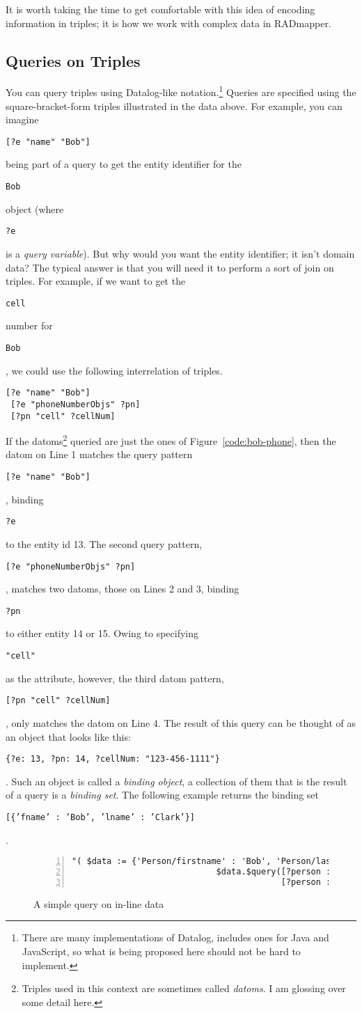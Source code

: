 \documentclass[9pt,letterpaper]{article}
\newcommand{\stt}[1]{\begin{footnotesize}\texttt{#1}\end{footnotesize}}
\begin{document}
It is worth taking the time to get comfortable with this idea of encoding information in triples;
it is how we work with complex data in RADmapper.

\subsection{Queries on Triples}

You can query triples using Datalog-like notation.\footnote{There are many implementations of Datalog, includes ones for Java and JavaScript, so what is being proposed here should not be hard to implement.}
Queries are specified using the square-bracket-form triples illustrated in the data above.
For example, you can imagine \stt{[?e "name" "Bob"]} being part of a query to get the entity identifier for the \stt{Bob} object (where \stt{?e} is a \textit{query variable}).
But why would you want the entity identifier; it isn't domain data?
The typical answer is that you will need it to perform a sort of join on triples.
For example, if we want to get the \stt{cell} number for \stt{Bob}, we could use the following interrelation of triples.

\begin{lstlisting}[basicstyle=\ttfamily\scriptsize]
 [?e "name" "Bob"]
 [?e "phoneNumberObjs" ?pn]
 [?pn "cell" ?cellNum]
\end{lstlisting}

If the datoms\footnote{Triples used in this context are sometimes called \textit{datoms}. I am glossing over some detail here.} queried are just the ones of
Figure~\ref{code:bob-phone}, then the datom on Line 1 matches the query pattern \stt{[?e "name" "Bob"]}, binding \stt{?e} to the entity id 13.
The second query pattern, \stt{[?e "phoneNumberObjs" ?pn]}, matches two datoms, those on Lines 2 and 3, binding \stt{?pn} to either entity 14 or 15.
Owing to specifying \stt{"cell"} as the attribute, however, the third datom pattern, \stt{[?pn "cell" ?cellNum]}, only matches the datom on Line 4.
The result of this query can be thought of as an object that looks like this: \stt{\{?e: 13, ?pn: 14, ?cellNum: "123-456-1111"\}}.
Such an object is called a \textit{binding object}, a collection of them that is the result of a query is a \textit{binding set}.
The following example returns the binding set \stt{[\{'fname' : 'Bob', 'lname' : 'Clark'\}]}.

\begin{figure}[H]
  \caption{A simple query on in-line data}
  \label{code:bob-clark}
\begin{lstlisting}[numberstyle=\scriptsize,basicstyle=\ttfamily\scriptsize,numbers=left,stepnumber=1,breaklines=true]
                          "( $data := {'Person/firstname' : 'Bob', 'Person/lastname' : 'Clark'};
                             $data.$query([?person :Person/firstname ?fname]
                                          [?person :Person/lastname  ?lname]) )"
\end{lstlisting}
\end{figure}
\end{document}
